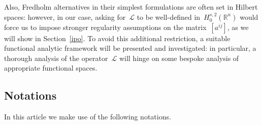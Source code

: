 \documentclass[11pt,hyp,]{nyjm}
\numberwithin{equation}{section}
\newcommand{\R}{\mathbb{R}}
\theoremstyle{remark}
\begin{document}
Also, Fredholm alternatives in their simplest formulations are often set in Hilbert spaces: however, in our case,
asking for~$\mathcal{L}$ to be well-defined in~$H_0^{s,2}(\R^n)$ would force us to impose stronger regularity assumptions on the matrix~$[a^{ij}]$, as we will show in Section~\ref{ipo}. To avoid this additional restriction, a suitable functional analytic framework will be
presented and investigated: in particular, a thorough analysis of the operator~$\mathcal{L}$ will hinge on some bespoke analysis of appropriate functional spaces.
 
\subsection{Notations}

In this article we make use of the following notations.
\end{document}

